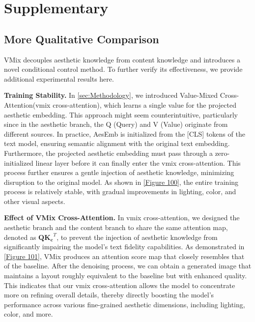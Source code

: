\clearpage
\setcounter{page}{1}


\section{Supplementary}
\label{sec:Supplementary}

\subsection{More Qualitative Comparison}
\label{More Qualitative Comparison}
VMix decouples aesthetic knowledge from content knowledge and introduces a novel conditional control method. To further verify its effectiveness, we provide additional experimental results here.

\noindent \textbf{Training Stability.} In \cref{sec:Methodology}, we introduced Value-Mixed Cross-Attention(vmix cross-attention), which learns a single value for the projected aesthetic embedding. This approach might seem counterintuitive, particularly since in the aesthetic branch, the Q (Query) and V (Value) originate from different sources. In practice, AesEmb is initialized from the [CLS] tokens of the text model, ensuring semantic alignment with the original text embedding. Furthermore, the projected aesthetic embedding must pass through a zero-initialized linear layer before it can finally enter the vmix cross-attention. This process further ensures a gentle injection of aesthetic knowledge, minimizing disruption to the original model. As shown in \cref{Figure 100}, the entire training process is relatively stable, with gradual improvements in lighting, color, and other visual aspects.

\noindent \textbf{Effect of VMix Cross-Attention.} In vmix cross-attention, we designed the aesthetic branch and the content branch to share the same attention map, denoted as $\mathbf{Q} \mathbf{K_c}^T$, to prevent the injection of aesthetic knowledge from significantly impairing the model's text fidelity capabilities. As demonstrated in \cref{Figure 101}, VMix produces an attention score map that closely resembles that of the baseline. After the denoising process, we can obtain a generated image that maintains a layout roughly equivalent to the baseline but with enhanced quality. This indicates that our vmix cross-attention allows the model to concentrate more on refining overall details, thereby directly boosting the model's performance across various fine-grained aesthetic dimensions, including lighting, color, and more.

